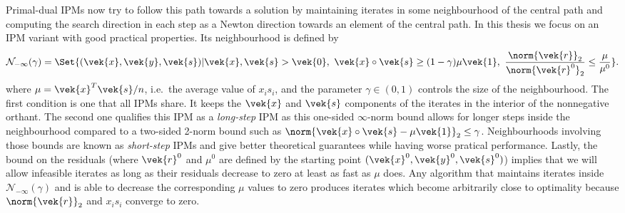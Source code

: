 Primal-dual IPMs now try to follow this path towards a solution by maintaining iterates in some neighbourhood of the central path and computing the search direction in each step as a Newton direction towards an element of the central path.
In this thesis we focus on an IPM variant with good practical properties.
Its neighbourhood is defined by
\begin{equation}
  \mathcal{N}_{-\infty}(\gamma) = \Set{ (\vek{x}, \vek{y}, \vek{s}) | \vek{x}, \vek{s} > \vek{0}, \ \vek{x} \circ \vek{s} \geq (1 - \gamma) \mu \vek{1}, \ \frac{\norm{\vek{r}}_2}{\norm{\vek{r}^0}_2} \leq \frac{\mu}{\mu^0} }. \label{eqn:neighbourhood}
\end{equation}
where \(\mu = \vek{x}^T \vek{s}/n\), i.e.\ the average value of \(x_i s_i\), and the parameter \(\gamma \in (0, 1)\) controls the size of the neighbourhood.
The first condition is one that all IPMs share.
It keeps the \(\vek{x}\) and \(\vek{s}\) components of the iterates in the interior of the nonnegative orthant.
The second one qualifies this IPM as a \emph{long-step} IPM as this one-sided \(\infty\)-norm bound allows for longer steps inside the neighbourhood compared to a two-sided 2-norm bound such as \(\norm{\vek{x} \circ \vek{s} - \mu \vek{1}}_2 \leq \gamma\).
Neighbourhoods involving those bounds are known as \emph{short-step} IPMs and give better theoretical guarantees while having worse pratical performance.
Lastly, the bound on the residuals (where \(\vek{r}^0\) and \(\mu^0\) are defined by the starting point \((\vek{x}^0, \vek{y}^0, \vek{s}^0)\)) implies that we will allow infeasible iterates as long as their residuals decrease to zero at least as fast as \(\mu\) does.
Any algorithm that maintains iterates inside \(\mathcal{N}_{-\infty}(\gamma)\) and is able to decrease the corresponding \(\mu\) values to zero produces iterates which become arbitrarily close to optimality because \(\norm{\vek{r}}_2\) and \(x_i s_i\) converge to zero.

